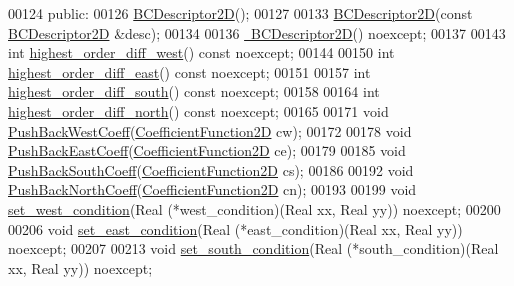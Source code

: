 \begin{DoxyCode}
00124  \textcolor{keyword}{public}:
00126   \hyperlink{classmtk_1_1BCDescriptor2D_abbc3af29202dbfef203f4cafd9566fd0}{BCDescriptor2D}();
00127 
00133   \hyperlink{classmtk_1_1BCDescriptor2D_abbc3af29202dbfef203f4cafd9566fd0}{BCDescriptor2D}(\textcolor{keyword}{const} \hyperlink{classmtk_1_1BCDescriptor2D}{BCDescriptor2D} &desc);
00134 
00136   \hyperlink{classmtk_1_1BCDescriptor2D_ae14e62548a8bc080d576fff6937c546b}{~BCDescriptor2D}() noexcept;
00137 
00143   \textcolor{keywordtype}{int} \hyperlink{classmtk_1_1BCDescriptor2D_a0fa469ddf6ff76e2858d6d3b76cc8b6f}{highest\_order\_diff\_west}() \textcolor{keyword}{const} noexcept;
00144 
00150   \textcolor{keywordtype}{int} \hyperlink{classmtk_1_1BCDescriptor2D_a5a9b80a2e9e579b05d9f3589d80448b6}{highest\_order\_diff\_east}() \textcolor{keyword}{const} noexcept;
00151 
00157   \textcolor{keywordtype}{int} \hyperlink{classmtk_1_1BCDescriptor2D_a463d909f6014e7f01b33171a06d7b400}{highest\_order\_diff\_south}() \textcolor{keyword}{const} noexcept;
00158 
00164   \textcolor{keywordtype}{int} \hyperlink{classmtk_1_1BCDescriptor2D_a87c5f2449247d65ea07784ba2ec61bc7}{highest\_order\_diff\_north}() \textcolor{keyword}{const} noexcept;
00165 
00171   \textcolor{keywordtype}{void} \hyperlink{classmtk_1_1BCDescriptor2D_a3da32ba89cfb15032bb1156394bad98c}{PushBackWestCoeff}(\hyperlink{group__c07-mim__ops_gad9e1c0ace886b0029aefffa5f320e852}{CoefficientFunction2D} cw);
00172 
00178   \textcolor{keywordtype}{void} \hyperlink{classmtk_1_1BCDescriptor2D_a27635428a6c36d1e305cafdc68271063}{PushBackEastCoeff}(\hyperlink{group__c07-mim__ops_gad9e1c0ace886b0029aefffa5f320e852}{CoefficientFunction2D} ce);
00179 
00185   \textcolor{keywordtype}{void} \hyperlink{classmtk_1_1BCDescriptor2D_a9eb891f14c68968a0113632fa5fea630}{PushBackSouthCoeff}(\hyperlink{group__c07-mim__ops_gad9e1c0ace886b0029aefffa5f320e852}{CoefficientFunction2D} cs);
00186 
00192   \textcolor{keywordtype}{void} \hyperlink{classmtk_1_1BCDescriptor2D_a0fed58bd058d699a572888fe4b9934a4}{PushBackNorthCoeff}(\hyperlink{group__c07-mim__ops_gad9e1c0ace886b0029aefffa5f320e852}{CoefficientFunction2D} cn);
00193 
00199   \textcolor{keywordtype}{void} \hyperlink{classmtk_1_1BCDescriptor2D_a006050efe15b1be75b36a74a23051392}{set\_west\_condition}(Real (*west\_condition)(Real xx, Real yy)) noexcept;
00200 
00206   \textcolor{keywordtype}{void} \hyperlink{classmtk_1_1BCDescriptor2D_a4ba8690e845f59a1507b056f3fc8061e}{set\_east\_condition}(Real (*east\_condition)(Real xx, Real yy)) noexcept;
00207 
00213   \textcolor{keywordtype}{void} \hyperlink{classmtk_1_1BCDescriptor2D_a408f159cc44d7ee610191efb8ed48b2a}{set\_south\_condition}(Real (*south\_condition)(Real xx, Real yy)) noexcept;

\end{DoxyCode}
